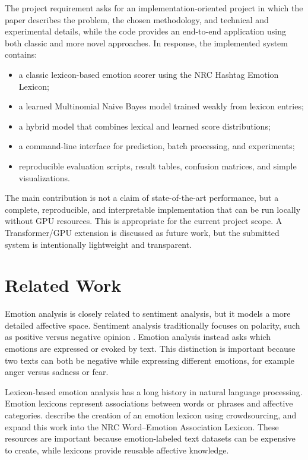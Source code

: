 \documentclass[11pt]{article}
\begin{document}
The project requirement asks for an implementation-oriented project in which the paper describes the problem, the chosen methodology, and technical and experimental details, while the code provides an end-to-end application using both classic and more novel approaches. In response, the implemented system contains:

\begin{itemize}
    \item a classic lexicon-based emotion scorer using the NRC Hashtag Emotion Lexicon;
    \item a learned Multinomial Naive Bayes model trained weakly from lexicon entries;
    \item a hybrid model that combines lexical and learned score distributions;
    \item a command-line interface for prediction, batch processing, and experiments;
    \item reproducible evaluation scripts, result tables, confusion matrices, and simple visualizations.
\end{itemize}

The main contribution is not a claim of state-of-the-art performance, but a complete, reproducible, and interpretable implementation that can be run locally without GPU resources. This is appropriate for the current project scope. A Transformer/GPU extension is discussed as future work, but the submitted system is intentionally lightweight and transparent.

\section{Related Work}

Emotion analysis is closely related to sentiment analysis, but it models a more detailed affective space. Sentiment analysis traditionally focuses on polarity, such as positive versus negative opinion \citep{pang2008opinion}. Emotion analysis instead asks which emotions are expressed or evoked by text. This distinction is important because two texts can both be negative while expressing different emotions, for example anger versus sadness or fear.

Lexicon-based emotion analysis has a long history in natural language processing. Emotion lexicons represent associations between words or phrases and affective categories. \citet{mohammad2010emotions} describe the creation of an emotion lexicon using crowdsourcing, and \citet{mohammad2013crowdsourcing} expand this work into the NRC Word--Emotion Association Lexicon. These resources are important because emotion-labeled text datasets can be expensive to create, while lexicons provide reusable affective knowledge.
\end{document}
